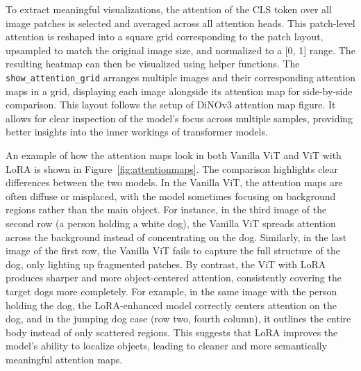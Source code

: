 \documentclass[10pt]{article}
\begin{document}
To extract meaningful visualizations, the attention of the CLS token over all image patches is selected and averaged across all attention heads. This patch-level attention is reshaped into a square grid corresponding to the patch layout, upsampled to match the original image size, and normalized to a [0, 1] range. The resulting heatmap can then be visualized using helper functions. The \texttt{show\_attention\_grid} arranges multiple images and their corresponding attention maps in a grid, displaying each image alongside its attention map for side-by-side comparison. This layout follows the setup of DiNOv3 attention map figure. It allows for clear inspection of the model's focus across multiple samples, providing better insights into the inner workings of transformer models.

An example of how the attention maps look in both Vanilla ViT and ViT with LoRA is shown in Figure~\ref{fig:attentionmaps}. The comparison highlights clear differences between the two models. In the Vanilla ViT, the attention maps are often diffuse or misplaced, with the model sometimes focusing on background regions rather than the main object. For instance, in the third image of the second row (a person holding a white dog), the Vanilla ViT spreads attention across the background instead of concentrating on the dog. Similarly, in the last image of the first row, the Vanilla ViT fails to capture the full structure of the dog, only lighting up fragmented patches. By contrast, the ViT with LoRA produces sharper and more object-centered attention, consistently covering the target dogs more completely. For example, in the same image with the person holding the dog, the LoRA-enhanced model correctly centers attention on the dog, and in the jumping dog case (row two, fourth column), it outlines the entire body instead of only scattered regions. This suggests that LoRA improves the model’s ability to localize objects, leading to cleaner and more semantically meaningful attention maps.
\end{document}
